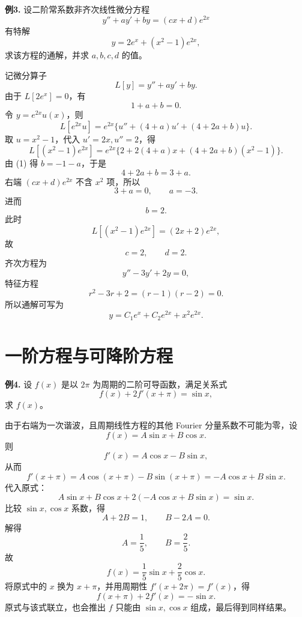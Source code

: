 \begin{problemblock}
\textbf{例3.} 设二阶常系数非齐次线性微分方程
\[
y''+ay'+by=(cx+d)e^{2x}
\]
有特解
\[
y=2e^x+(x^2-1)e^{2x},
\]
求该方程的通解，并求 \(a,b,c,d\) 的值。
\end{problemblock}
\begin{solutionblock}
记微分算子
\[
L[y]=y''+ay'+by.
\]
由于 \(L[2e^x]=0\)，有
\[
1+a+b=0. \tag{1}
\]
令 \(y=e^{2x}u(x)\)，则
\[
L[e^{2x}u]=e^{2x}\{u''+(4+a)u'+(4+2a+b)u\}.
\]
取 \(u=x^2-1\)，代入 \(u'=2x,u''=2\)，得
\[
L[(x^2-1)e^{2x}]
=e^{2x}\{2+2(4+a)x+(4+2a+b)(x^2-1)\}.
\]
由 (1) 得 \(b=-1-a\)，于是
\[
4+2a+b=3+a.
\]
右端 \((cx+d)e^{2x}\) 不含 \(x^2\) 项，所以
\[
3+a=0,\qquad a=-3.
\]
进而
\[
b=2.
\]
此时
\[
L[(x^2-1)e^{2x}]=(2x+2)e^{2x},
\]
故
\[
c=2,\qquad d=2.
\]
齐次方程为
\[
y''-3y'+2y=0,
\]
特征方程
\[
r^2-3r+2=(r-1)(r-2)=0.
\]
所以通解可写为
\[
y=C_1e^x+C_2e^{2x}+x^2e^{2x}.
\]
\end{solutionblock}

\section{一阶方程与可降阶方程}

\begin{problemblock}
\textbf{例4.} 设 \(f(x)\) 是以 \(2\pi\) 为周期的二阶可导函数，满足关系式
\[
f(x)+2f'(x+\pi)=\sin x,
\]
求 \(f(x)\)。
\end{problemblock}
\begin{solutionblock}
由于右端为一次谐波，且周期线性方程的其他 Fourier 分量系数不可能为零，设
\[
f(x)=A\sin x+B\cos x.
\]
则
\[
f'(x)=A\cos x-B\sin x,
\]
从而
\[
f'(x+\pi)=A\cos(x+\pi)-B\sin(x+\pi)
=-A\cos x+B\sin x.
\]
代入原式：
\[
A\sin x+B\cos x+2(-A\cos x+B\sin x)=\sin x.
\]
比较 \(\sin x,\cos x\) 系数，得
\[
A+2B=1,\qquad B-2A=0.
\]
解得
\[
A=\frac15,\qquad B=\frac25.
\]
故
\[
f(x)=\frac15\sin x+\frac25\cos x.
\]
将原式中的 \(x\) 换为 \(x+\pi\)，并用周期性 \(f'(x+2\pi)=f'(x)\)，得
\[
f(x+\pi)+2f'(x)=-\sin x.
\]
原式与该式联立，也会推出 \(f\) 只能由 \(\sin x,\cos x\) 组成，最后得到同样结果。
\end{solutionblock}

